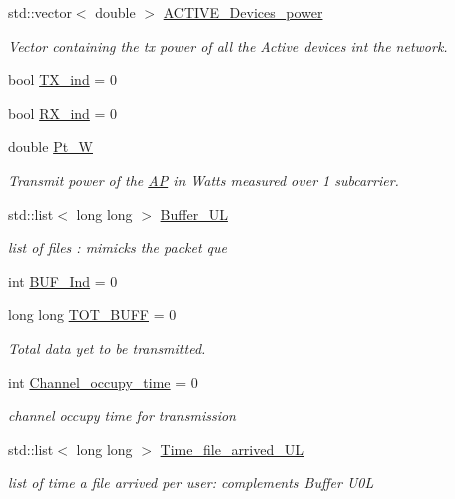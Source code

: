 \begin{DoxyCompactItemize}
std\-::vector$<$ double $>$ \hyperlink{classSTA_ae9a08d3223902c423ba041b7eba05e8c}{A\-C\-T\-I\-V\-E\-\_\-\-Devices\-\_\-power}
\begin{DoxyCompactList}\small\item\em Vector containing the tx power of all the Active devices int the network. \end{DoxyCompactList}\item 
bool \hyperlink{classSTA_a0ad8be1dec7b752e1be4f13e03faae4c}{T\-X\-\_\-ind} = 0
\item 
bool \hyperlink{classSTA_aace6d664e5ecf495177277ef030141c6}{R\-X\-\_\-ind} = 0
\item 
double \hyperlink{classSTA_a8ec6260021c741ccc08a6ec25793c1f3}{Pt\-\_\-\-W}
\begin{DoxyCompactList}\small\item\em Transmit power of the \hyperlink{classAP}{A\-P} in Watts measured over 1 subcarrier. \end{DoxyCompactList}\item 
std\-::list$<$ long long $>$ \hyperlink{classSTA_a8c7ef37eea259e8a2c662d0d4a0a73ff}{Buffer\-\_\-\-U\-L}
\begin{DoxyCompactList}\small\item\em list of files \-: mimicks the packet que \end{DoxyCompactList}\item 
int \hyperlink{classSTA_a1ca62aa52da9e93aacdf3aa8886966c2}{B\-U\-F\-\_\-\-Ind} = 0
\item 
long long \hyperlink{classSTA_aea9dd38428aa0d91147434e67ade8dad}{T\-O\-T\-\_\-\-B\-U\-F\-F} = 0
\begin{DoxyCompactList}\small\item\em Total data yet to be transmitted. \end{DoxyCompactList}\item 
int \hyperlink{classSTA_a409c7dfb7f0dd3688fdf655a36cdb9bc}{Channel\-\_\-occupy\-\_\-time} = 0
\begin{DoxyCompactList}\small\item\em channel occupy time for transmission \end{DoxyCompactList}\item 
std\-::list$<$ long long $>$ \hyperlink{classSTA_a41c09b640b596903776cb5367715b1ab}{Time\-\_\-file\-\_\-arrived\-\_\-\-U\-L}
\begin{DoxyCompactList}\small\item\em list of time a file arrived per user\-: complements Buffer U0\-L \end{DoxyCompactList}\item 

\end{DoxyCompactItemize}
